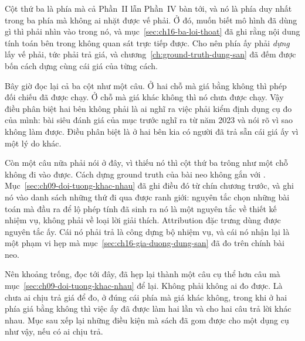 %
Cột thứ ba là phía mà cả Phần~II lẫn Phần~IV bàn tới, và nó là phía duy nhất
trong ba phía mà không ai nhặt được vế phải. Ở đó, muốn biết mô hình đã dùng gì
thì phải nhìn vào trong nó, và
mục~\ref{sec:ch16-ba-loi-thoat} đã ghi rằng nội dung tính toán bên trong không
quan sát trực tiếp được. Cho nên phía ấy phải \emph{dựng} lấy vế phải, tức phải
trả giá, và chương~\ref{ch:ground-truth-dung-san} đã đếm được bốn cách dựng cùng
cái giá của từng cách.

Bây giờ đọc lại cả ba cột như một câu. Ở hai chỗ mà giá bằng không thì phép đối
chiếu đã được chạy. Ở chỗ mà giá khác không thì nó chưa được chạy. Vậy điều phân
biệt hai bên không phải là ai nghĩ ra việc phải kiểm định dụng cụ đo của mình:
bài siêu đánh giá của mục trước nghĩ ra từ năm 2023 và nói rõ vì sao không làm
được. Điều phân biệt là ở hai bên kia có người đã trả sẵn cái giá ấy vì một lý do
khác.

%
Còn một câu nữa phải nói ở đây, vì thiếu nó thì cột thứ ba trông như một chỗ
không đi vào được. Cách dựng ground truth của bài neo không gắn với
.
Mục~\ref{sec:ch09-doi-tuong-khac-nhau} đã ghi điều đó từ chín chương trước,
và ghi nó vào danh sách những thứ đi qua được ranh giới: nguyên tắc chọn những
bài toán mà đầu ra để lộ phép tính đã sinh ra nó là một nguyên tắc về thiết kế
nhiệm vụ, không phải về loại lời giải thích. Attribution đặc trưng dùng được
nguyên tắc ấy. Cái nó phải trả là công dựng bộ nhiệm vụ, và cái nó nhận lại là
một phạm vi hẹp mà mục~\ref{sec:ch16-gia-duong-dung-san} đã đo trên chính bài
neo.

%
Nên khoảng trống, đọc tới đây, đã hẹp lại thành một câu cụ thể hơn câu mà
mục~\ref{sec:ch09-doi-tuong-khac-nhau} để lại. Không phải không ai đo được. Là
chưa ai chịu trả giá để đo, ở đúng cái phía mà giá khác không, trong khi ở hai
phía giá bằng không thì việc ấy đã được làm hai lần và cho hai câu trả lời khác
nhau. Mục sau xếp lại những điều kiện mà sách đã gom được cho một dụng cụ như
vậy, nếu có ai chịu trả.
